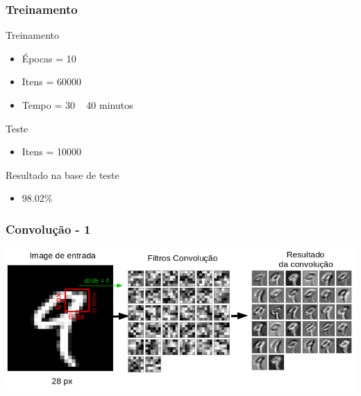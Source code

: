 \documentclass[tikz,11pt]{beamer}
\begin{document}
\begin{frame}
	\frametitle{Treinamento}
	\centering
		\centering
		\par Treinamento
		\begin{itemize}
			\item Épocas = 10
			\item Itens = 60000
			\item Tempo = 30 ~ 40 minutos
		\end{itemize}		
	\centering
	\par Teste
	\begin{itemize}
		\item Itens = 10000
	\end{itemize}		
	\centering
	\par Resultado na base de teste
	\begin{itemize}
		\item 98.02\%
	\end{itemize}

\end{frame}

\begin{frame}
	\frametitle{Convolução - 1}
	\centering
	\includegraphics[width=.8\paperwidth]{images/fabio/conv_1}
\end{frame}
\end{document}

